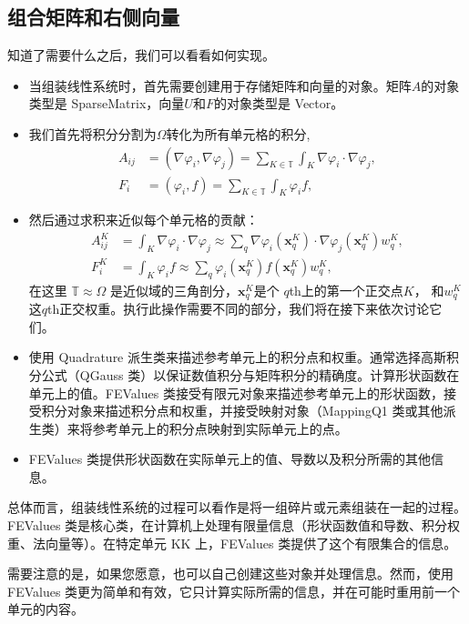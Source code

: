 \documentclass{ctexart}
\begin{document}
\subsection{组合矩阵和右侧向量}
知道了需要什么之后，我们可以看看如何实现。
\begin{itemize}
    \item 当组装线性系统时，首先需要创建用于存储矩阵和向量的对象。矩阵$ A $的对象类型是 SparseMatrix，向量$ U $和$ F $的对象类型是 Vector。
    \item 我们首先将积分分割为$\Omega$转化为所有单元格的积分,
    \begin{align*}
        A_{ij} &= (\nabla\varphi_i, \nabla \varphi_j)
        = \sum_{K \in {\mathbb T}} \int_K \nabla\varphi_i \cdot \nabla \varphi_j,
        \\
        F_i &= (\varphi_i, f)
        = \sum_{K \in {\mathbb T}} \int_K \varphi_i f,
    \end{align*}
    \item 然后通过求积来近似每个单元格的贡献：
    \begin{align*}
        A^K_{ij} &=
        \int_K \nabla\varphi_i \cdot \nabla \varphi_j
        \approx
        \sum_q \nabla\varphi_i(\mathbf x^K_q) \cdot \nabla
        \varphi_j(\mathbf x^K_q) w_q^K,
        \\
        F^K_i &=
        \int_K \varphi_i f
        \approx
        \sum_q \varphi_i(\mathbf x^K_q) f(\mathbf x^K_q) w^K_q,
    \end{align*}
    在这里 \(\mathbb{T} \approx \Omega\) 是近似域的三角剖分，\(\mathbf x^K_q\)是个 \(q\)th上的第一个正交点$K$， 和$w^K_q$这\(q\)th正交权重。执行此操作需要不同的部分，我们将在接下来依次讨论它们。
    \item 使用 Quadrature 派生类来描述参考单元上的积分点和权重。通常选择高斯积分公式（QGauss 类）以保证数值积分与矩阵积分的精确度。计算形状函数在单元上的值。FEValues 类接受有限元对象来描述参考单元上的形状函数，接受积分对象来描述积分点和权重，并接受映射对象（MappingQ1 类或其他派生类）来将参考单元上的积分点映射到实际单元上的点。
    \item FEValues 类提供形状函数在实际单元上的值、导数以及积分所需的其他信息。
\end{itemize}

总体而言，组装线性系统的过程可以看作是将一组碎片或元素组装在一起的过程。FEValues 类是核心类，在计算机上处理有限量信息（形状函数值和导数、积分权重、法向量等）。在特定单元 KK 上，FEValues 类提供了这个有限集合的信息。

需要注意的是，如果您愿意，也可以自己创建这些对象并处理信息。然而，使用 FEValues 类更为简单和有效，它只计算实际所需的信息，并在可能时重用前一个单元的内容。
\end{document}
